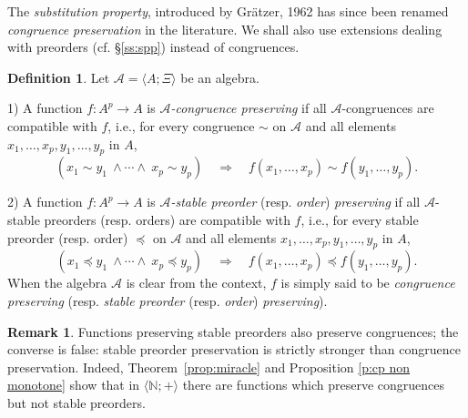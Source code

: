 \documentclass[11pt,a4paper]{article}
\theoremstyle{definition} %
\newtheorem{definition}[theorem]{Definition}
\newtheorem{remark}[theorem]{Remark}
\newcommand\+[1]{\mathcal{#1}} %
\newcommand{\N}{{\mathbb N}}     %
\begin{document}
\noindent The {\em substitution property}, 
introduced by Gr\"atzer, 1962 \cite{gratzer62} %
has since been renamed {\em congruence preservation} in the literature.  
We shall also use extensions dealing with preorders (cf. \S\ref{ss:spp}) %
instead of congruences.
%
\begin{definition}\label{def:congCompat 1}
Let $\+A=\langle A;\Xi\rangle$ be an algebra.

1) A function $f\colon A^p\longrightarrow A$
is {\em $\+A$-congruence preserving} if  all $\+A$-congruences are compatible with $f$, i.e., for every congruence $\sim$ on  $\+A$ and all elements
$x_1,\ldots,x_{p}, \allowbreak  y_1,\ldots,y_{p}$ in $A$,
\begin{equation}\label{eq:cp}
(x_1\sim y_1\ \wedge\cdots\wedge\ x_{p}\sim y_{p}
)\quad  \Longrightarrow \quad 
f(x_1,\ldots,x_p)\sim f(y_1,\ldots,y_p).
\end{equation}  

2) A function $f\colon A^p\longrightarrow A$ is {\em $\+A$-stable 
 preorder} (resp. {\em order})  {\em preserving} 
if all $\+A$-stable preorders (resp. orders) are compatible with $f$, i.e., for every stable preorder (resp. order) $\preceq$ on  $\+A$ and all elements
$x_1,\ldots,x_{p}, y_1,\ldots,y_{p}$ in $A$,
\begin{equation}\label{eq:spp}
(x_1\preceq y_1\ \wedge\cdots\wedge\ x_{p}\preceq y_{p})\quad
  \Longrightarrow \quad f(x_1,\ldots,x_p)\preceq f(y_1,\ldots,y_p).
\end{equation}
When the algebra $\+A$ is clear from the context,  $f$ is simply said to be {\em congruence preserving} (resp. {\em stable preorder} (resp. {\em order})  {\em preserving}).
\end{definition}
% 
 \begin{remark}  Functions preserving stable preorders also preserve congruences; the converse is false: stable preorder preservation is   strictly stronger  than congruence preservation. Indeed, Theorem~\ref{prop:miracle} and Proposition \ref{p:cp non monotone}
show that in $\langle\N;+\rangle$ there are functions which preserve congruences  but not  stable preorders.
\end{remark}
\end{document}
